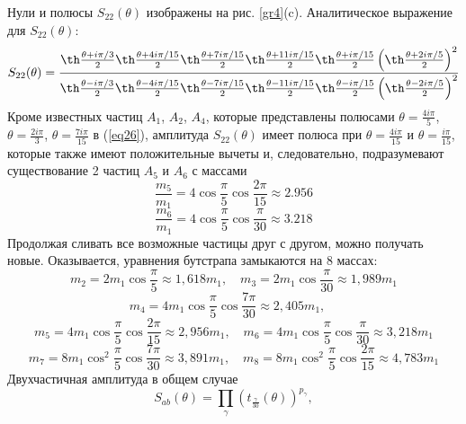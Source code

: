 \documentclass[12pt]{article}
\theoremstyle{definition}
\begin{document}
Нули и полюсы $S_{22}(\theta)$ изображены на рис. \ref{gr4}(c). Аналитическое выражение для $S_{22}(\theta)$:
\begin{equation}\label{eq26}
    S_{22}(\theta)=\frac{\th\frac{\theta+i\pi/3}{2}\th\frac{\theta+4i\pi/15}{2}\th\frac{\theta+7i\pi/15}{2}\th\frac{\theta+11i\pi/15}{2}\th\frac{\theta+i\pi/15}{2}\left(\th\frac{\theta+2i\pi/5}{2}\right)^2}{\th\frac{\theta-i\pi/3}{2}\th\frac{\theta-4i\pi/15}{2}\th\frac{\theta-7i\pi/15}{2}\th\frac{\theta-11i\pi/15}{2}\th\frac{\theta-i\pi/15}{2}\left(\th\frac{\theta-2i\pi/5}{2}\right)^2}
\end{equation}
Кроме известных частиц $A_1$, $A_2$, $A_4$, которые представлены полюсами $\theta=\frac{4i\pi}{5}$, $\theta=\frac{2i\pi}{3}$, $\theta=\frac{7i\pi}{15}$ в (\ref{eq26}), амплитуда $S_{22}(\theta)$ имеет полюса при $\theta=\frac{4i\pi}{15}$ и $\theta=\frac{i\pi}{15}$, которые также имеют положительные вычеты и, следовательно, подразумевают существование 2 частиц $A_5$ и $A_6$ с массами
\begin{equation}
    \frac{m_5}{m_1}=4\cos\frac{\pi}{5}\cos\frac{2\pi}{15}\approx2.956
\end{equation}
\begin{equation}
    \frac{m_6}{m_1}=4\cos\frac{\pi}{5}\cos\frac{\pi}{30}\approx3.218
\end{equation}
Продолжая сливать все возможные частицы друг с другом, можно получать новые. Оказывается, уравнения бутстрапа замыкаются на 8 массах:
\begin{equation}
    m_2=2m_1\cos\frac{\pi}{5}\approx1,618m_1,\quad m_3=2m_1\cos\frac{\pi}{30}\approx1,989m_1
\end{equation}
\begin{equation}
    m_4=4m_1\cos\frac{\pi}{5}\cos\frac{7\pi}{30}\approx2,405m_1,\quad 
\end{equation}
\begin{equation}
    m_5=4m_1\cos\frac{\pi}{5}\cos\frac{2\pi}{15}\approx2,956m_1,\quad m_6=4m_1\cos\frac{\pi}{5}\cos\frac{\pi}{30}\approx3,218m_1
\end{equation}
\begin{equation}
    m_7=8m_1\cos^2\frac{\pi}{5}\cos\frac{7\pi}{30}\approx3,891m_1,\quad m_8=8m_1\cos^2\frac{\pi}{5}\cos\frac{2\pi}{15}\approx4,783m_1
\end{equation}
Двухчастичная амплитуда в общем случае
\begin{equation}
    S_{ab}(\theta)=\prod\limits_\gamma(t_{\frac{\gamma}{30}}(\theta))^{p_\gamma},
\end{equation}
\end{document}
